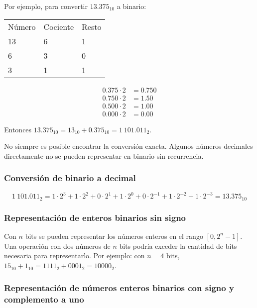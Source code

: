 \documentclass{article}
\begin{document}
Por ejemplo, para convertir $13.375_{10}$ a binario:

\begin{table}[h]
\centering
\begin{tabular}{lll}
    Número & Cociente & Resto \\
    13     & 6        & 1     \\
    6      & 3        & 0     \\
    3      & 1        & 1     \\
\end{tabular}
\end{table}

\begin{align*}
    0.375 \cdot 2 &= 0.750 \\
    0.750 \cdot 2 &= 1.50 \\
    0.500 \cdot 2 &= 1.00 \\
    0.000 \cdot 2 &= 0.00
\end{align*}

Entonces $13.375_{10} = 13_{10} + 0.375_{10} = 1\ 101.011_{2}$.

No siempre es posible encontrar la conversión exacta. Algunos números decimales
directamente no se pueden representar en binario sin recurrencia.

\subsubsection{Conversión de binario a decimal}

\begin{equation*}
    1\ 101.011_{2} = 1\cdot2^3 + 1\cdot2^2 + 0\cdot2^1 + 1\cdot2^0 + 
    0\cdot2^{-1} + 1\cdot2^{-2} + 1\cdot2^{-3} = 13.375_{10}
\end{equation*}

\subsubsection{Representación de enteros binarios sin signo}

Con $n$ bits se pueden representar los números enteros en el rango $[0, 2^n-1]$.
Una operación con dos números de $n$ bits podría exceder la cantidad de bits
necesaria para representarlo. Por ejemplo: con $n=4$ bits,
$15_{10} + 1_{10} = 1111_{2} + 0001_{2} = 10000_{2}$.

\subsubsection{Representación de números enteros binarios con signo y 
complemento a uno}
\end{document}
